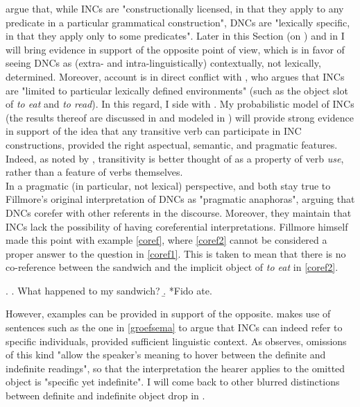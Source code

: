 \textcite[55]{TonelliDelmonte2011} argue that, while INCs are "constructionally licensed, in that they apply to any predicate in a particular grammatical construction", DNCs are "lexically specific, in that they apply only to some predicates". Later in this Section (on ) and in  I will bring evidence in support of the opposite point of view, which is in favor of seeing DNCs as (extra- and intra-linguistically) contextually, not lexically, determined. Moreover,  account is in direct conflict with \textcite[95]{Fillmore1986}, who argues that INCs are "limited to particular lexically defined environments" (such as the object slot of \textit{to eat} and \textit{to read}). In this regard, I side with \textcite{TonelliDelmonte2011}. My probabilistic model of INCs (the results thereof are discussed in  and modeled in ) will provide strong evidence in support of the idea that any transitive verb can participate in INC constructions, provided the right aspectual, semantic, and pragmatic features. Indeed, as noted by \textcite[216]{HuddlestonEtAl2002}, transitivity is better thought of as a property of verb \textit{use}, rather than a feature of verbs themselves.\\
In a pragmatic (in particular, not lexical) perspective, \textcite[44]{AnderBois} and \textcite[53-54]{Melchin2019} both stay true to Fillmore's original interpretation of DNCs as "pragmatic anaphoras", arguing that DNCs corefer with other referents in the discourse. Moreover, they maintain that INCs lack the possibility of having coreferential interpretations. Fillmore himself \parencite[97]{Fillmore1986} made this point with example \ref{coref}, where \ref{coref2} cannot be considered a proper answer to the question in \ref{coref1}. This is taken to mean that there is no co-reference between the sandwich and the implicit object of \textit{to eat} in \ref{coref2}.

\ex. \label{coref} \a. \label{coref1} What happened to my sandwich?
\b. \label{coref2} *Fido ate.

However, examples can be provided in support of the opposite. \textcite[142-144]{groefsema1995understood} makes use of sentences such as the one in \ref{groefsema} to argue that INCs can indeed refer to specific individuals, provided sufficient linguistic context. As \textcite[168]{scott2006less} observes, omissions of this kind "allow the speaker's meaning to hover between the definite and indefinite readings", so that the interpretation the hearer applies to the omitted object is "specific yet indefinite". I will come back to other blurred distinctions between definite and indefinite object drop in .

